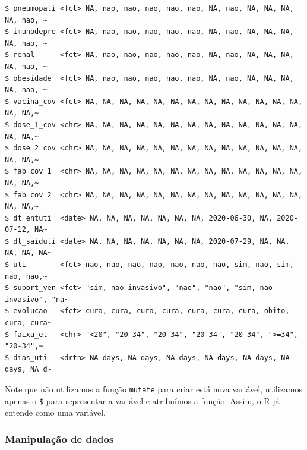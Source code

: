 \documentclass[
  letterpaper,
  DIV=11,
  numbers=noendperiod]{scrreprt}
\begin{document}
\begin{verbatim}
$ pneumopati <fct> NA, nao, nao, nao, nao, nao, NA, nao, NA, NA, NA, NA, nao, ~
$ imunodepre <fct> NA, nao, nao, nao, nao, nao, NA, nao, NA, NA, NA, NA, nao, ~
$ renal      <fct> NA, nao, nao, nao, nao, nao, NA, nao, NA, NA, NA, NA, nao, ~
$ obesidade  <fct> NA, nao, nao, nao, nao, nao, NA, nao, NA, NA, NA, NA, nao, ~
$ vacina_cov <fct> NA, NA, NA, NA, NA, NA, NA, NA, NA, NA, NA, NA, NA, NA, NA,~
$ dose_1_cov <chr> NA, NA, NA, NA, NA, NA, NA, NA, NA, NA, NA, NA, NA, NA, NA,~
$ dose_2_cov <chr> NA, NA, NA, NA, NA, NA, NA, NA, NA, NA, NA, NA, NA, NA, NA,~
$ fab_cov_1  <chr> NA, NA, NA, NA, NA, NA, NA, NA, NA, NA, NA, NA, NA, NA, NA,~
$ fab_cov_2  <chr> NA, NA, NA, NA, NA, NA, NA, NA, NA, NA, NA, NA, NA, NA, NA,~
$ dt_entuti  <date> NA, NA, NA, NA, NA, NA, NA, 2020-06-30, NA, 2020-07-12, NA~
$ dt_saiduti <date> NA, NA, NA, NA, NA, NA, NA, 2020-07-29, NA, NA, NA, NA, NA~
$ uti        <fct> nao, nao, nao, nao, nao, nao, nao, sim, nao, sim, nao, nao,~
$ suport_ven <fct> "sim, nao invasivo", "nao", "nao", "sim, nao invasivo", "na~
$ evolucao   <fct> cura, cura, cura, cura, cura, cura, cura, obito, cura, cura~
$ faixa_et   <chr> "<20", "20-34", "20-34", "20-34", "20-34", ">=34", "20-34",~
$ dias_uti   <drtn> NA days, NA days, NA days, NA days, NA days, NA days, NA d~
\end{verbatim}

Note que não utilizamos a função \texttt{mutate} para criar está nova
variável, utilizamos apenas o \texttt{\$} para representar a variável e
atribuímos a função. Assim, o R já entende como uma variável.

\hypertarget{manipulauxe7uxe3o-de-dados-1}{%
\subsubsection{Manipulação de
dados}\label{manipulauxe7uxe3o-de-dados-1}}
\end{document}
